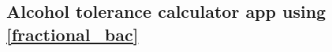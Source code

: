 \documentclass[11pt]{article}
\begin{document}
\subsection{Alcohol tolerance calculator app using \ref{fractional_bac}}











\end{document}

